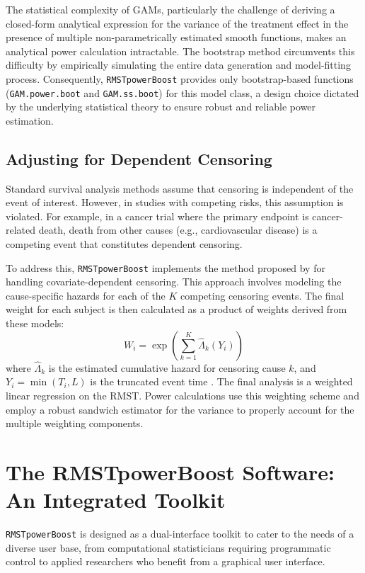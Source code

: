\documentclass[article]{jss}
\begin{document}
The statistical complexity of GAMs, particularly the challenge of deriving a closed-form analytical expression for the variance of the treatment effect in the presence of multiple non-parametrically estimated smooth functions, makes an analytical power calculation intractable. The bootstrap method circumvents this difficulty by empirically simulating the entire data generation and model-fitting process. Consequently, \texttt{RMSTpowerBoost} provides only bootstrap-based functions (\texttt{GAM.power.boot} and \texttt{GAM.ss.boot}) for this model class, a design choice dictated by the underlying statistical theory to ensure robust and reliable power estimation.

\subsection{Adjusting for Dependent Censoring}
Standard survival analysis methods assume that censoring is independent of the event of interest. However, in studies with competing risks, this assumption is violated. For example, in a cancer trial where the primary endpoint is cancer-related death, death from other causes (e.g., cardiovascular disease) is a competing event that constitutes dependent censoring.

To address this, \texttt{RMSTpowerBoost} implements the method proposed by \citet{wang2018} for handling covariate-dependent censoring. This approach involves modeling the cause-specific hazards for each of the $K$ competing censoring events. The final weight for each subject is then calculated as a product of weights derived from these models:
\begin{equation}
W_i = \exp\left(\sum_{k=1}^{K} \hat{\Lambda}_{k}(Y_i)\right)
\end{equation}
where $\hat{\Lambda}_{k}$ is the estimated cumulative hazard for censoring cause $k$, and $Y_i = \min(T_i, L)$ is the truncated event time \cite{[1]}. The final analysis is a weighted linear regression on the RMST. Power calculations use this weighting scheme and employ a robust sandwich estimator for the variance to properly account for the multiple weighting components.

\section{The RMSTpowerBoost Software: An Integrated Toolkit}
\texttt{RMSTpowerBoost} is designed as a dual-interface toolkit to cater to the needs of a diverse user base, from computational statisticians requiring programmatic control to applied researchers who benefit from a graphical user interface.
\end{document}
